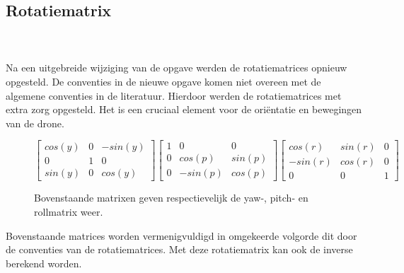 \subsection{Rotatiematrix}
\\\\
Na een uitgebreide wijziging van de opgave werden de rotatiematrices opnieuw opgesteld. De conventies in de nieuwe opgave komen niet overeen met de algemene conventies in de literatuur. Hierdoor werden de rotatiematrices met extra zorg opgesteld. Het is een cruciaal element voor de ori\"entatie en bewegingen van de drone.

\begin{figure}[h!]
	\centering
		\(
		\begin{bmatrix} 
			cos(y) & 0 & -sin(y) \\ 
			0 & 1 & 0 \\
			sin(y) & 0 & cos(y)
		\end{bmatrix}
		\begin{bmatrix} 
			1 & 0 & 0 \\ 
			0 & cos(p) & sin(p) \\
			0 & -sin(p) & cos(p)
		\end{bmatrix}
		\begin{bmatrix} 
			cos(r) & sin(r) & 0 \\ 
			-sin(r) & cos(r) & 0 \\
			0 & 0 & 1
		\end{bmatrix}
		\)
	\caption{Bovenstaande matrixen geven respectievelijk de yaw-, pitch- en rollmatrix weer.}
\end{figure}
\noindent
Bovenstaande matrices worden vermenigvuldigd in omgekeerde volgorde dit door de conventies van de rotatiematrices. Met deze rotatiematrix kan ook de inverse berekend worden.